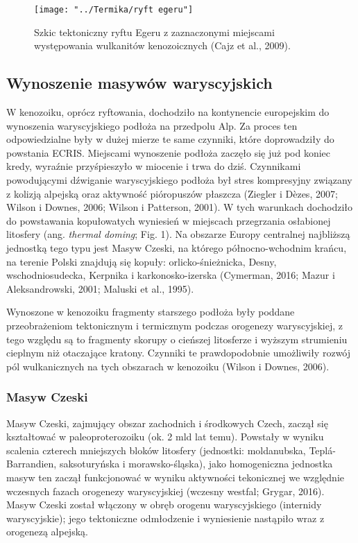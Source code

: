 \documentclass[11.5pt,twoside]{report}
\begin{document}
\begin{figure}[h]
	\centering
	\texttt{[image: "../Termika/ryft egeru"]}
	\caption{Szkic tektoniczny ryftu Egeru z zaznaczonymi miejscami występowania wulkanitów kenozoicznych (Cajz et al., 2009).}
	\label{Fig.}
\end{figure}


	\subsection{Wynoszenie masywów waryscyjskich}
	
W kenozoiku, oprócz ryftowania, dochodziło na kontynencie europejskim do wynoszenia waryscyjskiego podłoża na przedpolu Alp. Za proces ten odpowiedzialne były w dużej mierze te same czynniki, które doprowadziły do powstania ECRIS. Miejscami wynoszenie podłoża zaczęło się już pod koniec kredy, wyra\'{z}nie przyśpieszyło w miocenie i trwa do dziś. Czynnikami powodującymi d\'{z}wiganie waryscyjskiego podłoża był stres kompresyjny związany z kolizją alpejską oraz aktywność pióropuszów płaszcza (Ziegler i D\`{e}zes, 2007; Wilson i Downes, 2006; Wilson i Patterson, 2001). W tych warunkach dochodziło do powstawania kopułowatych wyniesień w miejscach przegrzania osłabionej litosfery (ang. \textit{thermal doming}; Fig. 1). Na obszarze Europy centralnej najbliższą jednostką tego typu jest Masyw Czeski, na którego północno-wchodnim krańcu, na terenie Polski znajdują się kopuły: orlicko-śnieżnicka, Desny, wschodniosudecka, Kerpnika i karkonosko-izerska (Cymerman, 2016; Mazur i Aleksandrowski, 2001; Maluski et al., 1995). 

Wynoszone w kenozoiku fragmenty starszego podłoża były poddane przeobrażeniom tektonicznym i termicznym podczas orogenezy waryscyjskiej, z tego względu są to fragmenty skorupy o cieńszej litosferze i wyższym strumieniu cieplnym niż otaczające kratony. Czynniki te prawdopodobnie umożliwiły rozwój pól wulkanicznych na tych obszarach w kenozoiku (Wilson i Downes, 2006).

\subsubsection{Masyw Czeski}

Masyw Czeski, zajmujący obszar zachodnich i środkowych Czech, zaczął się kształtować w paleoproterozoiku (ok. 2 mld lat temu). Powstały w wyniku scalenia czterech mniejszych bloków litosfery (jednostki: moldanubska, Tepl\'{a}-Barrandien, saksoturyńska i morawsko-śląska), jako homogeniczna jednostka masyw ten zaczął funkcjonować w wyniku aktywności tekonicznej we względnie wczesnych fazach orogenezy waryscyjskiej (wczesny westfal; Grygar, 2016). Masyw Czeski został włączony w obręb orogenu waryscyjskiego (internidy waryscyjskie); jego tektoniczne odmłodzenie i wyniesienie nastąpiło wraz z orogenezą alpejską. 
	
\end{document}
